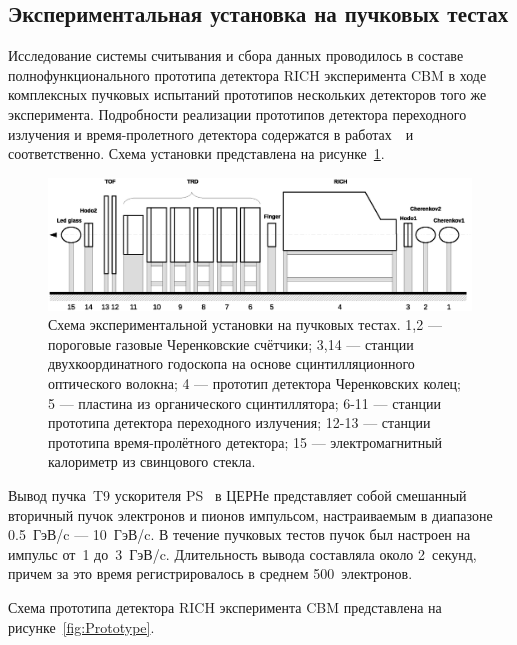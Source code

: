 \subsection{Экспериментальная установка на пучковых тестах}\label{section:secBeamtimeSetup}

Исследование системы считывания и сбора данных проводилось в составе полнофункционального прототипа детектора RICH эксперимента CBM в ходе комплексных пучковых испытаний прототипов нескольких детекторов того же эксперимента. Подробности реализации прототипов детектора переходного излучения и время-пролетного детектора содержатся в работах~\cite{}~и~\cite{} соответственно. Схема установки представлена на рисунке~\ref{fig:Beamtime}.

\begin{figure}
\includegraphics[width=1.0\textwidth]{pictures/9_Beamtime_setup_Full.eps}
\caption{Схема экспериментальной установки на пучковых тестах. 1,2 --- пороговые газовые Черенковские счётчики; 3,14 --- станции двухкоординатного годоскопа на основе сцинтилляционного оптического волокна; 4 --- прототип детектора Черенковских колец; 5 --- пластина из органического сцинтиллятора; 6-11 --- станции прототипа детектора переходного излучения; 12-13 --- станции прототипа время-пролётного детектора; 15 --- электромагнитный калориметр из свинцового стекла.}
\label{fig:Beamtime}
\end{figure}

Вывод пучка~T9 ускорителя PS~\cite{CERNPST9} в ЦЕРНе представляет собой смешанный вторичный пучок электронов и пионов импульсом, настраиваемым в диапазоне 0.5~ГэВ/c --- 10~ГэВ/c. В течение пучковых тестов пучок был настроен на импульс от~1 до~3~ГэВ/c. Длительность вывода составляла около 2~секунд, причем за это время регистрировалось в среднем 500~электронов.

Схема прототипа детектора RICH эксперимента CBM представлена на рисунке~\ref{fig:Prototype}.

